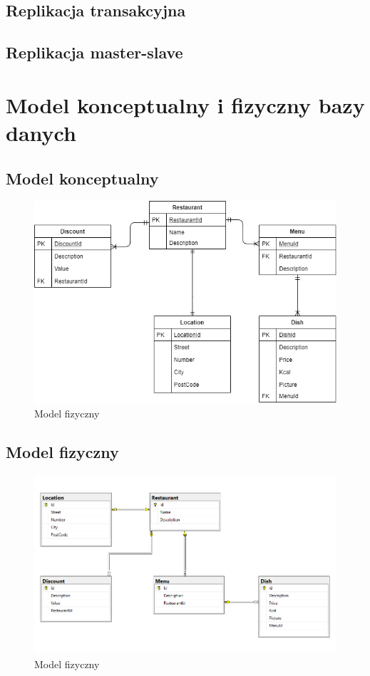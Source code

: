 \documentclass{article}
\begin{document}
	\subsection{Replikacja transakcyjna}

	\subsection{Replikacja master-slave}

\section{Model konceptualny i fizyczny bazy danych}
	\subsection{Model konceptualny}
\begin{figure}[hbt!]
				\includegraphics[width=16cm]{Files/Pictures/Model_K}
				\centering
				\caption{Model fizyczny}
			\end{figure}
	\subsection{Model fizyczny}
\begin{figure}[hbt!]
				\includegraphics[width=16cm]{Files/Pictures/Model}
				\centering
				\caption{Model fizyczny}
			\end{figure}
\end{document}
